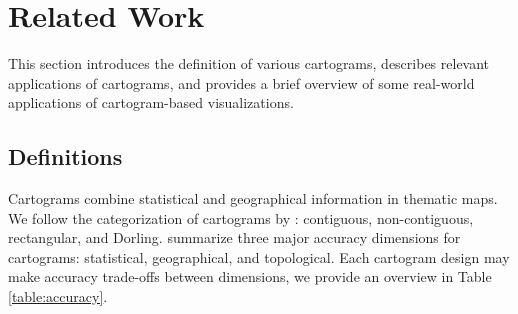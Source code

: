 \section{Related Work}

This section introduces the definition of various cartograms, describes relevant applications of cartograms, and provides a brief overview of some real-world applications of cartogram-based visualizations.

\subsection{Definitions}

Cartograms combine statistical and geographical information in thematic maps. We follow the categorization of cartograms by : contiguous, non-contiguous, rectangular, and Dorling.  summarize three major accuracy dimensions for cartograms: statistical, geographical, and topological. Each cartogram design may make accuracy trade-offs between dimensions, we provide an overview in Table \ref{table:accuracy}.

{
\renewcommand{\arraystretch}{1.5}
\begin{table}[!b]
	\centering
	\caption{\textcolor{Mycolor3}{\textbf{Trade-off between dimensions}}. \textcolor{Mycolor6}{\textbf{Dimension sacrificed}} in order to improve \textcolor{Mycolor5}{\textbf{target dimension}}'s accuracy.}
	\label{table:accuracy}
\end{table}
}


